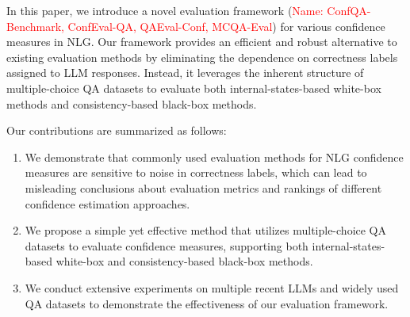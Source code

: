 In this paper, we introduce a novel evaluation framework (\textcolor{red}{Name: ConfQA-Benchmark, ConfEval-QA, QAEval-Conf, MCQA-Eval}) for various confidence measures in NLG. Our framework provides an efficient and robust alternative to existing evaluation methods by eliminating the dependence on correctness labels assigned to LLM responses. Instead, it leverages the inherent structure of multiple-choice QA datasets to evaluate both internal-states-based white-box methods and consistency-based black-box methods. 

Our contributions are summarized as follows:
\begin{enumerate}
    \item We demonstrate that commonly used evaluation methods for NLG confidence measures are sensitive to noise in correctness labels, which can lead to misleading conclusions about evaluation metrics and rankings of different confidence estimation approaches.
    \item We propose a simple yet effective method that utilizes multiple-choice QA datasets to evaluate confidence measures, supporting both internal-states-based white-box and consistency-based black-box methods.
    \item We conduct extensive experiments on multiple recent LLMs and widely used QA datasets to demonstrate the effectiveness of our evaluation framework. 
\end{enumerate}

